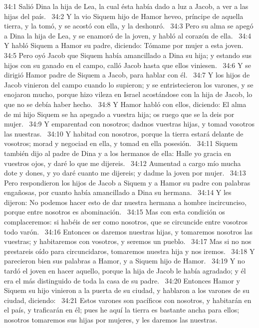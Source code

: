 34:1 Salió Dina la hija de Lea, la cual ésta había dado a luz a Jacob, a ver a las hijas del país.  
34:2 Y la vio Siquem hijo de Hamor heveo, príncipe de aquella tierra, y la tomó, y se acostó con ella, y la deshonró.  
34:3 Pero su alma se apegó a Dina la hija de Lea, y se enamoró de la joven, y habló al corazón de ella.  
34:4 Y habló Siquem a Hamor su padre, diciendo: Tómame por mujer a esta joven.  
34:5 Pero oyó Jacob que Siquem había amancillado a Dina su hija; y estando sus hijos con su ganado en el campo, calló Jacob hasta que ellos viniesen.  
34:6 Y se dirigió Hamor padre de Siquem a Jacob, para hablar con él.  
34:7 Y los hijos de Jacob vinieron del campo cuando lo supieron; y se entristecieron los varones, y se enojaron mucho, porque hizo vileza en Israel acostándose con la hija de Jacob, lo que no se debía haber hecho.  
34:8 Y Hamor habló con ellos, diciendo: El alma de mi hijo Siquem se ha apegado a vuestra hija; os ruego que se la deis por mujer.  
34:9 Y emparentad con nosotros; dadnos vuestras hijas, y tomad vosotros las nuestras.  
34:10 Y habitad con nosotros, porque la tierra estará delante de vosotros; morad y negociad en ella, y tomad en ella posesión.  
34:11 Siquem también dijo al padre de Dina y a los hermanos de ella: Halle yo gracia en vuestros ojos, y daré lo que me dijereis.  
34:12 Aumentad a cargo mío mucha dote y dones, y yo daré cuanto me dijereis; y dadme la joven por mujer.  
34:13 Pero respondieron los hijos de Jacob a Siquem y a Hamor su padre con palabras engañosas, por cuanto había amancillado a Dina su hermana.  
34:14 Y les dijeron: No podemos hacer esto de dar nuestra hermana a hombre incircunciso, porque entre nosotros es abominación.  
34:15 Mas con esta condición os complaceremos: si habéis de ser como nosotros, que se circuncide entre vosotros todo varón.  
34:16 Entonces os daremos nuestras hijas, y tomaremos nosotros las vuestras; y habitaremos con vosotros, y seremos un pueblo.  
34:17 Mas si no nos prestareis oído para circuncidaros, tomaremos nuestra hija y nos iremos.  
34:18 Y parecieron bien sus palabras a Hamor, y a Siquem hijo de Hamor.  
34:19 Y no tardó el joven en hacer aquello, porque la hija de Jacob le había agradado; y él era el más distinguido de toda la casa de su padre.  
34:20 Entonces Hamor y Siquem su hijo vinieron a la puerta de su ciudad, y hablaron a los varones de su ciudad, diciendo:  
34:21 Estos varones son pacíficos con nosotros, y habitarán en el país, y traficarán en él; pues he aquí la tierra es bastante ancha para ellos; nosotros tomaremos sus hijas por mujeres, y les daremos las nuestras.  
